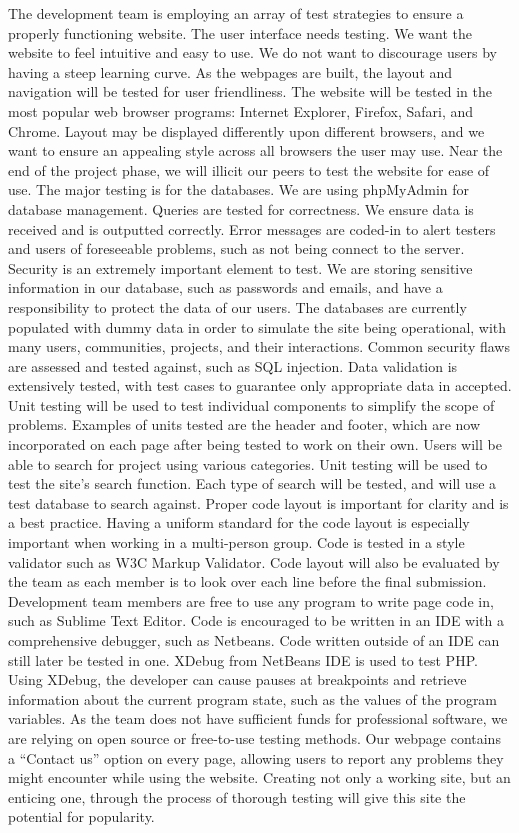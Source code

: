 \documentclass[12pt]{article}
\begin{document}
\begin{enumerate}
The development team is employing an array of test strategies to ensure a properly functioning website. The user interface needs testing. We want the website to feel intuitive and easy to use. We do not want to discourage users by having a steep learning curve. As the webpages are built, the layout and navigation will be tested for user friendliness. The website will be tested in the most popular web browser programs: Internet Explorer, Firefox, Safari, and Chrome. Layout may be displayed differently upon different browsers, and we want to ensure an appealing style across all browsers the user may use. Near the end of the project phase, we will illicit our peers to test the website for ease of use. The major testing is for the databases. We are using phpMyAdmin for database management. Queries are tested for correctness. We ensure data is received and is outputted correctly. Error messages are coded-in to alert testers and users of foreseeable problems, such as not being connect to the server. Security is an extremely important element to test. We are storing sensitive information in our database, such as passwords and emails, and have a responsibility to protect the data of our users. The databases are currently populated with dummy data in order to simulate the site being operational, with many users, communities, projects, and their interactions. Common security flaws are assessed and tested against, such as SQL injection. Data validation is extensively tested, with test cases to guarantee only appropriate data in accepted. Unit testing will be used to test individual components to simplify the scope of problems. Examples of units tested are the header and footer, which are now incorporated on each page after being tested to work on their own. Users will be able to search for project using various categories. Unit testing will be used to test the site’s search function. Each type of search will be tested, and will use a test database to search against. Proper code layout is important for clarity and is a best practice. Having a uniform standard for the code layout is especially important when working in a multi-person group. Code is tested in a style validator such as W3C Markup Validator. Code layout will also be evaluated by the team as each member is to look over each line before the final submission. Development team members are free to use any program to write page code in, such as Sublime Text Editor. Code is encouraged to be written in an IDE with a comprehensive debugger, such as Netbeans. Code written outside of an IDE can still later be tested in one. XDebug from NetBeans IDE is used to test PHP. Using XDebug, the developer can cause pauses at breakpoints and retrieve information about the current program state, such as the values of the program variables. As the team does not have sufficient funds for professional software, we are relying on open source or free-to-use testing methods. Our webpage contains a “Contact us” option on every page, allowing users to report any problems they might encounter while using the website. Creating not only a working site, but an enticing one, through the process of thorough testing will give this site the potential for popularity.

\end{enumerate}
\end{document}
